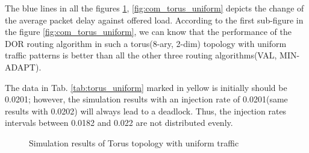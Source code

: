 The blue lines in all the figures \ref{fig:torus_uniform}, \ref{fig:com_torus_uniform} depicts the change of the average packet delay against offered load. According to the first sub-figure in the figure \ref{fig:com_torus_uniform}, we can know that the performance of the DOR routing algorithm in such a torus(8-ary, 2-dim) topology with uniform traffic patterns is better than all the other three routing algorithms(VAL, MIN-ADAPT).

The data in Tab. \ref{tab:torus_uniform} marked in yellow is initially should be 0.0201; however, the simulation results with an injection rate of 0.0201(same results with 0.0202) will always lead to a deadlock. Thus, the injection rates intervals between 0.0182 and 0.022 are not distributed evenly.

\begin{figure}[H]
    \centering
    \caption{Simulation results of Torus topology with uniform traffic}
    \label{fig:torus_uniform}
\end{figure}


